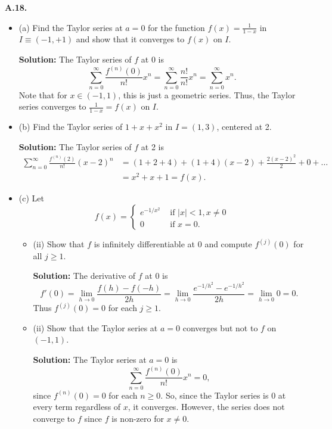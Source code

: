 \documentclass[12pt]{article}
\begin{document}
{\bf A.18.}
\begin{itemize}[label={},leftmargin=4mm, itemsep=1em, parsep=1em]
  \item (a) Find the Taylor series at $a = 0$ for the function $f(x) =
    \frac{1}{1-x}$ in $I\equiv (-1, +1)$ and show that it converges to $f(x)$ on
    $I$.

  {\bf Solution:} The Taylor series of $f$ at 0 is 
  \[ \sum_{n=0}^{\infty}\frac{f^{(n)}(0)}{n!}x^{n} =
  \sum_{n=0}^{\infty}\frac{n!}{n!}x^{n} = \sum_{n=0}^{\infty}x^{n}. \]
  Note that for $x \in (-1, 1)$, this is just a geometric series. Thus, the
  Taylor series converges to $\frac{1}{1-x} = f(x)$ on $I$.

  \item (b) Find the Taylor series of $1 + x + x^{2}$ in $I = (1,3)$, centered at
  2.

  {\bf Solution:} The Taylor series of $f$ at 2 is 
  \begin{align*}
    \sum_{n=0}^{\infty}\frac{f^{(n)}(2)}{n!}(x-2)^{n} & = (1+2+4) + (1+4)(x-2) +
    \frac{2(x-2)^{2}}{2} + 0 + \dots \\
    & = x^{2} + x + 1 = f(x).
  \end{align*}

  \item (c) Let 
    \[ f(x) = \left\{ \begin{array}{cl}
        e^{-1/x^{2}} & \text{ if } |x| < 1, x \neq 0 \\
        0 & \text{ if } x = 0.
    \end{array} \right. \]
  \begin{itemize}[label={},leftmargin=4mm, itemsep=1em, parsep=1em]
    \item (ii) Show that $f$ is infinitely differentiable at 0 and compute
      $f^{(j)}(0)$ for all $j \geq 1$.

    {\bf Solution:} The derivative of $f$ at 0 is 
    \[ f'(0) = \lim_{h\rightarrow 0}\frac{f(h) - f(-h)}{2h} = \lim_{h\rightarrow
    0} \frac{e^{-1/h^{2}} - e^{-1/h^{2}}}{2h} = \lim_{h\rightarrow 0} 0 = 0. \]
    Thus $f^{(j)}(0) = 0$ for each $j \geq 1$.

    \item (ii) Show that the Taylor series at $a = 0$ converges but not to $f$
      on $(-1, 1)$.

    {\bf Solution:} The Taylor series at $a = 0$ is 
    \[ \sum_{n=0}^{\infty}\frac{f^{(n)}(0)}{n!}x^{n} = 0, \]
    since $f^{(n)}(0) = 0$ for each $n \geq 0$. So, since the Taylor series is 0
    at every term regardless of $x$, it converges. However, the series does not
    converge to $f$ since $f$ is non-zero for $x \neq 0$.
  \end{itemize}
\end{itemize}
\end{document}
